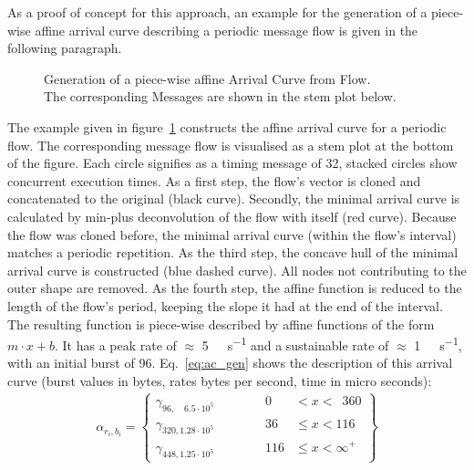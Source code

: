 As a proof of concept for this approach, an example for the generation of a piece-wise affine arrival curve
describing a periodic message flow is given in the following paragraph.
%
\begin{figure}[H]

\caption{Generation of a piece-wise affine Arrival Curve from Flow.\\The corresponding Messages are shown in the stem plot below.}
  \label{fig:arrival}
\end{figure}
%
The example given in figure~\ref{fig:arrival} constructs the affine arrival curve for a periodic flow.
The corresponding message flow is visualised as a stem plot at the bottom of the figure. Each circle signifies as a timing message of \SI{32}{\byte}, stacked circles show concurrent execution times. 
As a first step, the flow's vector is cloned and concatenated to the original (black curve). Secondly, the minimal arrival curve is calculated by min-plus deconvolution of the flow with itself (red curve). Because the flow was cloned before, the minimal arrival curve (within the flow's interval) matches a periodic repetition. As the third step, the concave hull of the minimal arrival curve is constructed (blue dashed curve).
All nodes not contributing to the outer shape are removed. As the fourth step, the affine function is reduced to the length of the flow's period, keeping the slope it had at the end of the interval.
The resulting function is piece-wise described by affine functions of the form $m\cdot x + b$. It has a peak rate of $\approx$ \SI{5}{\mega\bit\per\second} and a sustainable rate of $\approx$ \SI{1}{\mega\bit\per\second}, with an initial burst of \SI{96}{\byte}.
Eq.~\ref{eq:ac_gen} shows the description of this arrival curve (burst values in bytes, rates bytes per second, time in micro seconds):
\begin{align}
\label{eq:ac_gen}
\alpha_{r_i, b_i} = \left\{
\begin{array}{lcrl}
\gamma_{96,\phantom{0} \phantom{1}6.5 \cdot 10^{5}}  & \hspace{1cm} & 0 & < x < \phantom{1}360 \\
\gamma_{320, 1.28 \cdot 10^{5}} & \hspace{1cm} & 36  & \le x < 116 \\
\gamma_{448, 1.25 \cdot 10^{5}} & \hspace{1cm} & 116 & \le x < \infty^+
\end{array}
\right\}
\end{align}

